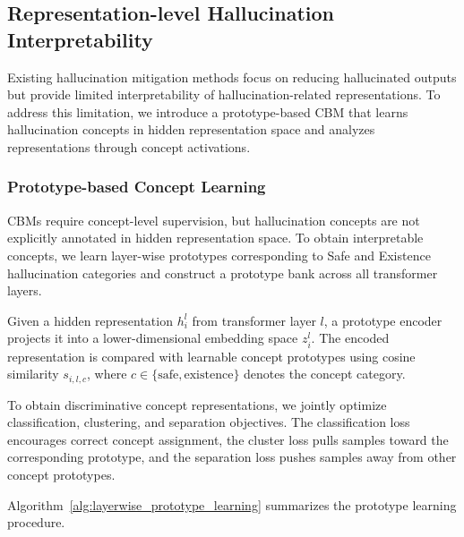 \subsection{Representation-level Hallucination Interpretability}

Existing hallucination mitigation methods focus on reducing hallucinated outputs but provide limited interpretability of hallucination-related representations. To address this limitation, we introduce a prototype-based CBM that learns hallucination concepts in hidden representation space and analyzes representations through concept activations.


\subsubsection{Prototype-based Concept Learning}

CBMs require concept-level supervision, but hallucination concepts are not explicitly annotated in hidden representation space. To obtain interpretable concepts, we learn layer-wise prototypes corresponding to Safe and Existence hallucination categories and construct a prototype bank across all transformer layers.

Given a hidden representation $h_i^l$ from transformer layer $l$, a prototype encoder projects it into a lower-dimensional embedding space $z_i^l$. The encoded representation is compared with learnable concept prototypes using cosine similarity $s_{i,l,c}$, where $c \in \{\text{safe}, \text{existence}\}$ denotes the concept category.

To obtain discriminative concept representations, we jointly optimize classification, clustering, and separation objectives. The classification loss encourages correct concept assignment, the cluster loss pulls samples toward the corresponding prototype, and the separation loss pushes samples away from other concept prototypes.

Algorithm~\ref{alg:layerwise_prototype_learning} summarizes the prototype learning procedure.

